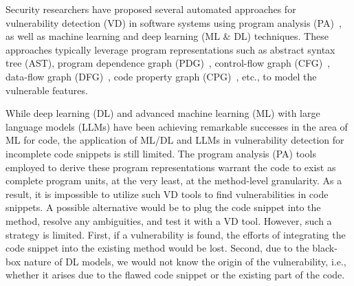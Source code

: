 Security researchers have proposed several automated approaches for vulnerability detection (VD) in software systems using program analysis (PA)~\cite{FlawFinder,RATS,viega2000its4,Checkmarx,HPFortify,Coverity}, as well as machine learning and deep learning (ML \& DL) \cite{fse21,chakraborty2020deep,zhou2019devign,li2018sysevr,li2018vuldeepecker} techniques. These approaches typically leverage program representations such as abstract syntax tree (AST), program dependence graph (PDG)~\cite{fse21,li2018vuldeepecker}, control-flow graph (CFG)~\cite{zhou2019devign}, data-flow graph (DFG)~\cite{zhou2019devign}, code property graph (CPG)~\cite{chakraborty2020deep}, etc., to model the vulnerable features. 

While deep learning (DL) and advanced machine learning (ML) with large
language models (LLMs) have been achieving remarkable successes in the
area of ML for code, the application of ML/DL and LLMs in
vulnerability detection for incomplete code snippets is still
limited. The program analysis (PA) tools employed to derive these
program representations warrant the code to exist as complete program
units, at the very least, at the method-level granularity. As a
result, it is impossible to utilize such VD tools to find
vulnerabilities in code snippets. A possible alternative would be to
plug the code snippet into the method, resolve any ambiguities, and
test it with a VD tool. However, such a strategy is limited. First, if
a vulnerability is found, the efforts of integrating the code snippet
into the existing method would be lost. Second, due to the black-box
nature of DL models, we would not know the origin of the
vulnerability, i.e., whether it arises due to the flawed code snippet
or the existing part of the code.

